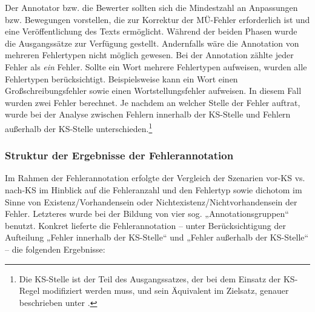 Der Annotator bzw. die Bewerter sollten sich die Mindestzahl an Anpassungen bzw. Bewegungen vorstellen, die zur Korrektur der MÜ-Fehler erforderlich ist und eine Veröffentlichung des Texts ermöglicht. Während der beiden Phasen wurde die Ausgangssätze zur Verfügung gestellt. Andernfalls wäre die Annotation von mehreren Fehlertypen nicht möglich gewesen. Bei der Annotation zählte jeder Fehler als \textit{ein} Fehler. Sollte ein Wort mehrere Fehlertypen aufweisen, wurden alle Fehlertypen berücksichtigt. Beispielsweise kann ein Wort einen Großschreibungsfehler sowie einen Wortstellungsfehler aufweisen. In diesem Fall wurden zwei Fehler berechnet. Je nachdem an welcher Stelle der Fehler auftrat, wurde bei der Analyse zwischen Fehlern innerhalb der KS-Stelle und Fehlern außerhalb der KS-Stelle unterschieden.\footnote{{{{Die KS-Stelle ist der Teil des Ausgangssatzes, der bei dem Einsatz der KS-Regel modifiziert werden muss, und sein Äquivalent im Zielsatz, genauer beschrieben unter .}}}}

\subsubsection{\label{sec:4.4.4.3} Struktur der Ergebnisse der Fehlerannotation}

Im Rahmen der Fehlerannotation erfolgte der Vergleich der Szenarien vor-KS vs. nach-KS im Hinblick auf die Fehleranzahl und den Fehlertyp sowie dichotom im Sinne von Existenz/Vorhandensein oder Nichtexistenz/Nichtvorhandensein der Fehler. Letzteres wurde bei der Bildung von vier sog. „Annotationsgruppen“ benutzt. Konkret lieferte die Fehlerannotation -- unter Berücksichtigung der Aufteilung „Fehler innerhalb der KS-Stelle“ und „Fehler außerhalb der KS-Stelle“ -- die folgenden Ergebnisse:

